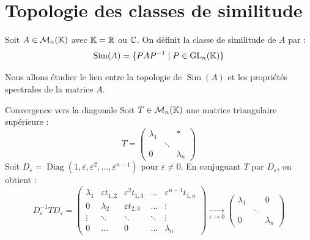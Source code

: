\section{Topologie des classes de similitude}

\begin{definitionnt}{}
    Soit $A \in \mathcal{M}_n(\mathbb{K})$ avec $\mathbb{K} = \mathbb{R}$ ou $\mathbb{C}$. On définit la classe de similitude de $A$ par :
    \[ \operatorname{Sim}(A) = \{ P A P^{-1} \mid P \in \operatorname{GL}_n(\mathbb{K}) \} \]
\end{definitionnt}

Nous allons étudier le lien entre la topologie de $\operatorname{Sim}(A)$ et les propriétés spectrales de la matrice $A$.

\begin{proposition}{Convergence vers la diagonale}{}
    Soit $T \in \mathcal{M}_n(\mathbb{K})$ une matrice triangulaire supérieure :
    \[ T = \begin{pmatrix} 
        \lambda_1 & & * \\ 
        & \ddots & \\ 
        0 & & \lambda_n 
    \end{pmatrix} \]
    Soit $D_\varepsilon = \operatorname{Diag}(1, \varepsilon, \varepsilon^2, \dots, \varepsilon^{n-1})$ pour $\varepsilon \neq 0$. 
    En conjuguant $T$ par $D_\varepsilon$, on obtient :
    \[ D_\varepsilon^{-1} T D_\varepsilon = \begin{pmatrix} 
        \lambda_1 & \varepsilon t_{1,2} & \varepsilon^2 t_{1,3} & \dots & \varepsilon^{n-1} t_{1,n} \\ 
        0 & \lambda_2 & \varepsilon t_{2,3} & \dots & \vdots \\ 
        \vdots & \ddots & \ddots & \ddots & \vdots \\
        0 & \dots & 0 & \dots & \lambda_n 
    \end{pmatrix} \xrightarrow[\varepsilon \to 0]{} \begin{pmatrix} 
        \lambda_1 & & 0 \\ 
        & \ddots & \\ 
        0 & & \lambda_n 
    \end{pmatrix} \]
\end{proposition}


